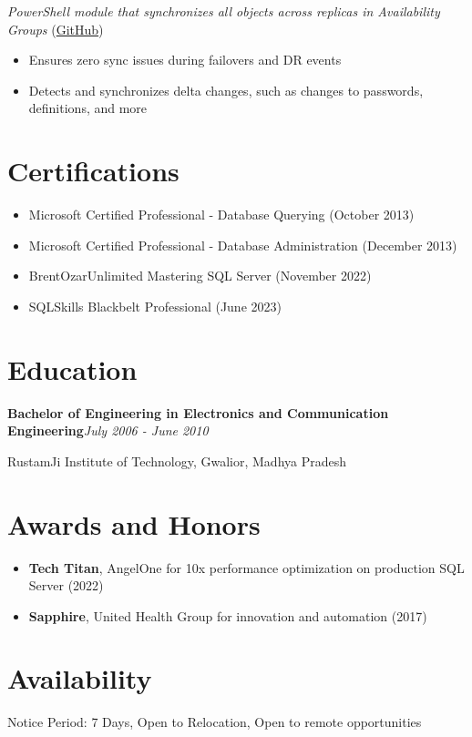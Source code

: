 \documentclass[10pt,a4paper]{article}
\begin{document}
\textit{PowerShell module that synchronizes all objects across replicas in Availability Groups} (\href{https://github.com/imajaydwivedi/HadrSync}{GitHub})
\begin{itemize}
  \item Ensures zero sync issues during failovers and DR events
  \item Detects and synchronizes delta changes, such as changes to passwords, definitions, and more
\end{itemize}

\section{Certifications}
\begin{itemize}
  \item Microsoft Certified Professional - Database Querying (October 2013)
  \item Microsoft Certified Professional - Database Administration (December 2013)
  \item BrentOzarUnlimited Mastering SQL Server (November 2022)
  \item SQLSkills Blackbelt Professional (June 2023)
\end{itemize}

\section{Education}
\noindent\textbf{Bachelor of Engineering in Electronics and Communication Engineering}\hfill \textit{July 2006 - June 2010}

RustamJi Institute of Technology, Gwalior, Madhya Pradesh

\section{Awards and Honors}
\begin{itemize}
  \item \textbf{Tech Titan}, AngelOne for 10x performance optimization on production SQL Server (2022)
  \item \textbf{Sapphire}, United Health Group for innovation and automation (2017)
\end{itemize}

\section{Availability}
Notice Period: 7 Days, Open to Relocation, Open to remote opportunities
\end{document}
